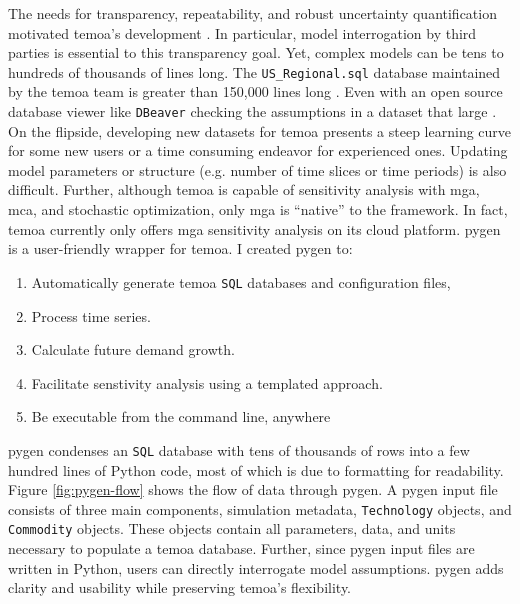 The needs for transparency, repeatability, and robust uncertainty quantification
motivated \gls{temoa}'s development \cite{hunter_modeling_2013}.
In particular, model interrogation by third parties is essential to this transparency
goal. Yet, complex models can be tens to hundreds of thousands of lines long. The
\texttt{US\_Regional.sql} database maintained by the \gls{temoa} team is greater
than 150,000 lines long \cite{model_databases_2021}. Even with an open source
database viewer like \texttt{DBeaver} checking the assumptions in a dataset that large
\cite{noauthor_dbeaver_nodate}. On the flipside, developing new datasets for
\gls{temoa} presents a steep learning curve for some new users or a time consuming
endeavor for experienced ones. Updating model parameters or structure (e.g. number
of time slices or time periods) is also difficult. Further, although \gls{temoa}
is capable of sensitivity analysis with \gls{mga}, \gls{mca}, and stochastic
optimization, only \gls{mga} is ``native'' to the framework. In fact, \gls{temoa}
currently only offers \gls{mga} sensitivity analysis on its cloud platform.
\gls{pygen} is a user-friendly wrapper for \gls{temoa}.
I created \gls{pygen} to:
\begin{enumerate}
  \item Automatically generate \gls{temoa} \texttt{SQL} databases and configuration files,
  \item Process time series.
  \item Calculate future demand growth.
  \item Facilitate senstivity analysis using a templated approach.
  \item Be executable from the command line, anywhere
\end{enumerate}
\gls{pygen} condenses an \texttt{SQL} database with tens of thousands of rows into
a few hundred lines of Python code, most of which is due to formatting for
readability. Figure \ref{fig:pygen-flow} shows the flow of data through \gls{pygen}.
A \gls{pygen} input file consists of three main components, simulation metadata,
\texttt{Technology} objects, and \texttt{Commodity} objects. These objects
contain all parameters, data, and units necessary to populate a \gls{temoa}
database. Further, since \gls{pygen} input files are written in Python, users
can directly interrogate model assumptions. \gls{pygen} adds clarity and usability
while preserving \gls{temoa}'s flexibility.

